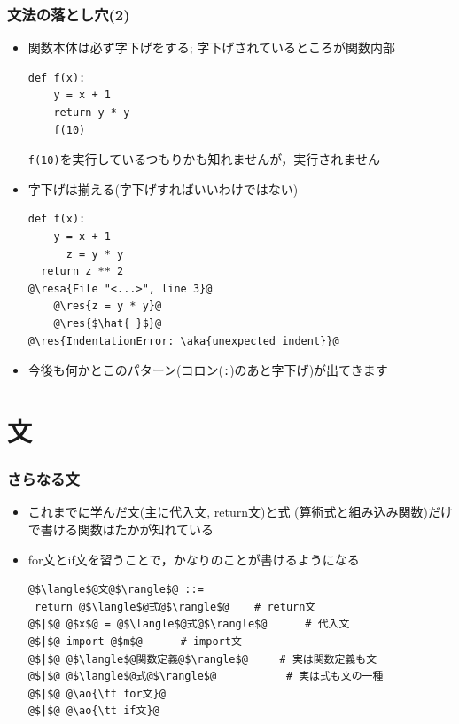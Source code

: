 \documentclass[10pt,dvipdfmx]{beamer}
\newcommand{\ore}[1]{{\color{orange}#1}}
\newcommand{\ao}[1]{{\color{blue}#1}}
\newcommand{\aka}[1]{{\color{red}#1}}
\newcommand{\resa}[1]{\ore{\textsl{$\rightarrow$ #1}}}
\newcommand{\res}[1]{\ore{\textsl{#1}}}
\begin{document}
\begin{frame}[fragile]
\frametitle{文法の落とし穴(2)}
\begin{itemize}

\item 関数本体は\aka{必ず字下げ}をする; 字下げされているところが関数内部
\begin{lstlisting}
def f(x):
    y = x + 1
    return y * y
    f(10)
\end{lstlisting}
{\tt f(10)}を実行しているつもりかも知れませんが，実行されません
  
\item 字下げは\aka{揃える}(字下げすればいいわけではない)
\begin{lstlisting}
def f(x):
    y = x + 1
      z = y * y
  return z ** 2
@\resa{File "<...>", line 3}@
    @\res{z = y * y}@
    @\res{$\hat{ }$}@
@\res{IndentationError: \aka{unexpected indent}}@
\end{lstlisting}

\item 今後も何かとこのパターン(\ao{コロン({\tt :})のあと字下げ})が出てきます

\end{itemize}
\end{frame}

\section{文}

\begin{frame}[fragile]
\frametitle{さらなる文}

\begin{itemize}
\item これまでに学んだ文(主に代入文, return文)と式
  (算術式と組み込み関数)だけで書ける関数はたかが知れている
\item for文とif文を習うことで，かなりのことが書けるようになる

\begin{lstlisting}
@$\langle$@文@$\rangle$@ ::=
 return @$\langle$@式@$\rangle$@    # return文
@$|$@ @$x$@ = @$\langle$@式@$\rangle$@      # 代入文
@$|$@ import @$m$@      # import文
@$|$@ @$\langle$@関数定義@$\rangle$@     # 実は関数定義も文
@$|$@ @$\langle$@式@$\rangle$@           # 実は式も文の一種
@$|$@ @\ao{\tt for文}@
@$|$@ @\ao{\tt if文}@
\end{lstlisting}
\end{itemize}


\end{frame}
\end{document}
